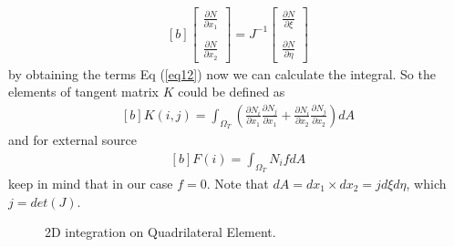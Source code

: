 \documentclass[]{article}
\begin{document}
\begin{equation}\label{eq16}
	\begin{aligned}[b]
\begin{bmatrix}
	\frac{\partial N}{\partial x_{1}}\\
	\\
	\frac{\partial N}{\partial x_{2}}  
\end{bmatrix}
= J^{-1}
\begin{bmatrix}
	\frac{\partial N}{\partial \xi}\\
	\\
	\frac{\partial N}{\partial \eta}
\end{bmatrix}
	\end{aligned}
\end{equation}
 by obtaining the terms Eq (\ref{eq12}) now we can calculate the integral. So the elements of tangent matrix $K$ could be defined as
\begin{equation}\label{eq17}
	\begin{aligned}[b]
		K(i,j) = \int_{\Omega_{T}} (\frac{\partial N_{i}}{\partial x_{1}}
		\frac{\partial N_{j}}{\partial x_{1}}+\frac{\partial N_{i}}{\partial x_{2}} 
		\frac{\partial N_{j}}{\partial x_{2}}) dA
	\end{aligned}
\end{equation}
and for external source 
\begin{equation}\label{eq18}
	\begin{aligned}[b]
		F(i) = \int_{\Omega_{T}} N_{i}f dA
	\end{aligned}
\end{equation}
keep in mind that in our case $f=0$. Note that $dA=dx_{1} \times dx_{2}=jd\xi d\eta$, which $j=det(J)$.
\begin{figure}[htbp]
	\centering
	
	\caption{2D integration on Quadrilateral Element.}
	\label{fig_int}
\end{figure} 
\end{document}
